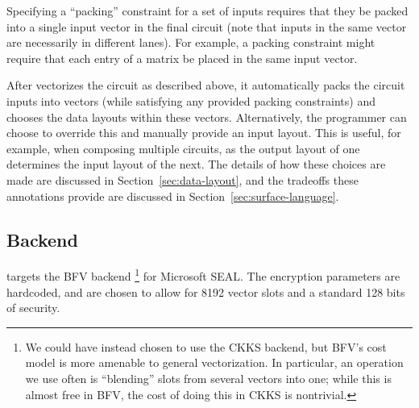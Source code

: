 Specifying a ``packing'' constraint for a set of inputs requires that they be packed into a single input vector in the final circuit (note that inputs in the same vector are necessarily in different lanes).
For example, a packing constraint might require that each entry of a matrix be placed in the same input vector.

After \system vectorizes the circuit as described above, it automatically packs the circuit inputs into vectors (while satisfying any provided packing constraints) and chooses the data layouts within these vectors.
Alternatively, the programmer can choose to override this and manually provide an input layout. %
This is useful, for example, when composing multiple circuits, as the output layout of one determines the input layout of the next.
The details of how these choices are made are discussed in Section~\ref{sec:data-layout}, and the tradeoffs these annotations provide are discussed in Section~\ref{sec:surface-language}.%
\subsection{Backend}
\system targets the BFV backend \footnote{We could have instead chosen to use the CKKS backend, but BFV's cost model is more amenable to general vectorization. In particular, an operation we use often is ``blending'' slots from several vectors into one; while this is almost free in BFV, the cost of doing this in CKKS is nontrivial. } for Microsoft SEAL\cite{seal}.
The encryption parameters are hardcoded, and are chosen to allow for 8192 vector slots and a standard 128 bits of security.